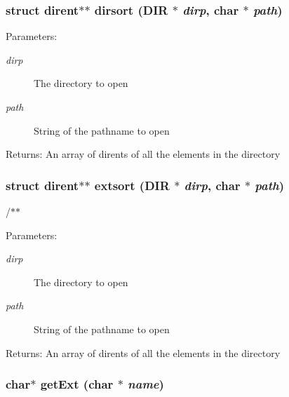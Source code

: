 \subsubsection{\setlength{\rightskip}{0pt plus 5cm}struct dirent$\ast$$\ast$ dirsort (DIR $\ast$ {\em dirp}, char $\ast$ {\em path})}\label{dir_8h_13b4a073dc6dca161b39fdfd42f6a6e2}


\begin{Desc}
\item[Parameters:]
\begin{description}
\item[{\em dirp}]The directory to open \item[{\em path}]String of the pathname to open \end{description}
\end{Desc}
\begin{Desc}
\item[Returns:]An array of dirents of all the elements in the directory \end{Desc}
\subsubsection{\setlength{\rightskip}{0pt plus 5cm}struct dirent$\ast$$\ast$ extsort (DIR $\ast$ {\em dirp}, char $\ast$ {\em path})}\label{dir_8h_14a9483372576e318550bc8c78065a86}


/$\ast$$\ast$ \begin{Desc}
\item[Parameters:]
\begin{description}
\item[{\em dirp}]The directory to open \item[{\em path}]String of the pathname to open \end{description}
\end{Desc}
\begin{Desc}
\item[Returns:]An array of dirents of all the elements in the directory \end{Desc}
\subsubsection{\setlength{\rightskip}{0pt plus 5cm}char$\ast$ get\-Ext (char $\ast$ {\em name})}\label{dir_8h_b5146e12b68e0fa300b937c05e77e0ea}


